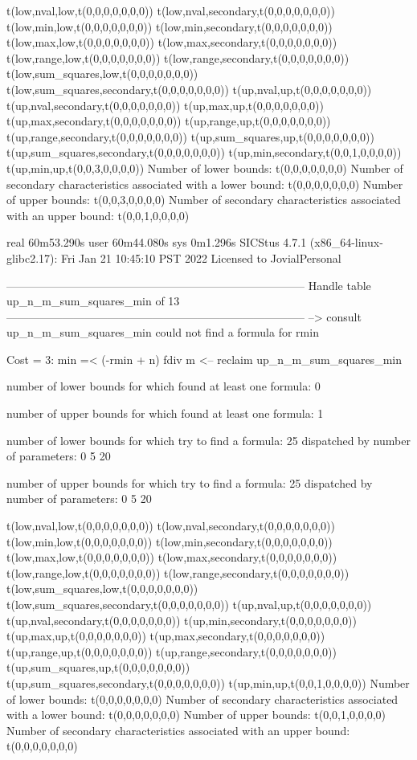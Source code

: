 t(low,nval,low,t(0,0,0,0,0,0,0))
t(low,nval,secondary,t(0,0,0,0,0,0,0))
t(low,min,low,t(0,0,0,0,0,0,0))
t(low,min,secondary,t(0,0,0,0,0,0,0))
t(low,max,low,t(0,0,0,0,0,0,0))
t(low,max,secondary,t(0,0,0,0,0,0,0))
t(low,range,low,t(0,0,0,0,0,0,0))
t(low,range,secondary,t(0,0,0,0,0,0,0))
t(low,sum_squares,low,t(0,0,0,0,0,0,0))
t(low,sum_squares,secondary,t(0,0,0,0,0,0,0))
t(up,nval,up,t(0,0,0,0,0,0,0))
t(up,nval,secondary,t(0,0,0,0,0,0,0))
t(up,max,up,t(0,0,0,0,0,0,0))
t(up,max,secondary,t(0,0,0,0,0,0,0))
t(up,range,up,t(0,0,0,0,0,0,0))
t(up,range,secondary,t(0,0,0,0,0,0,0))
t(up,sum_squares,up,t(0,0,0,0,0,0,0))
t(up,sum_squares,secondary,t(0,0,0,0,0,0,0))
t(up,min,secondary,t(0,0,1,0,0,0,0))
t(up,min,up,t(0,0,3,0,0,0,0))
Number of lower bounds:                                             t(0,0,0,0,0,0,0)
Number of secondary characteristics associated with a lower bound:  t(0,0,0,0,0,0,0)
Number of upper bounds:                                             t(0,0,3,0,0,0,0)
Number of secondary characteristics associated with an upper bound: t(0,0,1,0,0,0,0)

real	60m53.290s
user	60m44.080s
sys	0m1.296s
SICStus 4.7.1 (x86_64-linux-glibc2.17): Fri Jan 21 10:45:10 PST 2022
Licensed to JovialPersonal


--------------------------------------------------------------------------------
Handle table up_n_m_sum_squares_min of 13
--------------------------------------------------------------------------------
--> consult up_n_m_sum_squares_min
could not find a formula for rmin

Cost =  3:  min =< (-rmin + n) fdiv m %
<-- reclaim up_n_m_sum_squares_min

number of lower bounds for which found at least one formula: 0

number of upper bounds for which found at least one formula: 1

number of lower bounds for which try to find a formula: 25
dispatched by number of parameters: 0  5  20

number of upper bounds for which try to find a formula: 25
dispatched by number of parameters: 0  5  20

t(low,nval,low,t(0,0,0,0,0,0,0))
t(low,nval,secondary,t(0,0,0,0,0,0,0))
t(low,min,low,t(0,0,0,0,0,0,0))
t(low,min,secondary,t(0,0,0,0,0,0,0))
t(low,max,low,t(0,0,0,0,0,0,0))
t(low,max,secondary,t(0,0,0,0,0,0,0))
t(low,range,low,t(0,0,0,0,0,0,0))
t(low,range,secondary,t(0,0,0,0,0,0,0))
t(low,sum_squares,low,t(0,0,0,0,0,0,0))
t(low,sum_squares,secondary,t(0,0,0,0,0,0,0))
t(up,nval,up,t(0,0,0,0,0,0,0))
t(up,nval,secondary,t(0,0,0,0,0,0,0))
t(up,min,secondary,t(0,0,0,0,0,0,0))
t(up,max,up,t(0,0,0,0,0,0,0))
t(up,max,secondary,t(0,0,0,0,0,0,0))
t(up,range,up,t(0,0,0,0,0,0,0))
t(up,range,secondary,t(0,0,0,0,0,0,0))
t(up,sum_squares,up,t(0,0,0,0,0,0,0))
t(up,sum_squares,secondary,t(0,0,0,0,0,0,0))
t(up,min,up,t(0,0,1,0,0,0,0))
Number of lower bounds:                                             t(0,0,0,0,0,0,0)
Number of secondary characteristics associated with a lower bound:  t(0,0,0,0,0,0,0)
Number of upper bounds:                                             t(0,0,1,0,0,0,0)
Number of secondary characteristics associated with an upper bound: t(0,0,0,0,0,0,0)

